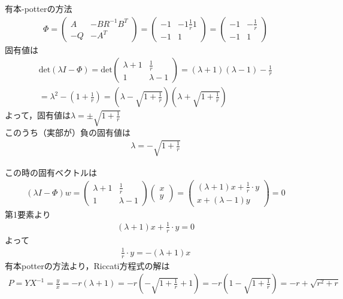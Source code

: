 \documentclass[a4paper,11pt]{jreport}
\begin{document}
有本-potterの方法
\begin{align*}
 \Phi = \left(\begin{array}{cc}
	       A  & - B R^{-1} B^T \\
	       -Q & - A^T
	      \end{array}\right)
      = \left(\begin{array}{cc}
	       -1  & - 1\frac{1}{r} 1 \\
	       -1 & 1
	      \end{array}\right)
      = \left(\begin{array}{cc}
	       -1  & - \frac{1}{r}  \\
	       -1 & 1
	      \end{array}\right)
\end{align*}
固有値は
\begin{align*}
	\mbox{det}(\lambda I-\Phi) 
	= \mbox{det}
		\left(\begin{array}{cc}
	       \lambda+1  & \frac{1}{r}  \\
	       1 & \lambda -1
	      \end{array}\right)
	= (\lambda +1)(\lambda-1) -\frac{1}{r}
\\
	= \lambda^2-(1+\frac{1}{r})
	=(\lambda-\sqrt{1+\frac{1}{r}})(\lambda+\sqrt{1+\frac{1}{r}})
\end{align*}
よって，固有値は$\lambda = \pm \sqrt{1+\frac{1}{r}}$\\
このうち（実部が）負の固有値は
\begin{align*}
	\lambda = - \sqrt{1+\frac{1}{r}}
\end{align*}

この時の固有ベクトルは
\begin{align*}
	(\lambda I-\Phi)  w
	=	\left(\begin{array}{cc}
	       \lambda+1  &  \frac{1}{r}  \\
	       1 & \lambda -1
	      \end{array}\right)
		\left(\begin{array}{c}
	       x  \\
	       y
	      \end{array}\right)
	=	\left(\begin{array}{c}
	      (\lambda+1)x  + \frac{1}{r}\cdot y  \\
	       x + (\lambda -1)y
	      \end{array}\right)
	= 0
\end{align*}
第1要素より
\begin{align*}
	      (\lambda+1)x  + \frac{1}{r}\cdot y  = 0
\end{align*}
よって
\begin{align*}
	      \frac{1}{r}\cdot y= - (\lambda+1)x  
\end{align*}
有本potterの方法より，Riccati方程式の解は
\begin{align*}
	      P = Y X^{-1} = \frac{y}{x} = -r(\lambda+1) = -r(- \sqrt{1+\frac{1}{r}}+1) = -r(1-\sqrt{1+\frac{1}{r}})=-r +\sqrt{r^2+r}
\end{align*}
\end{document}
